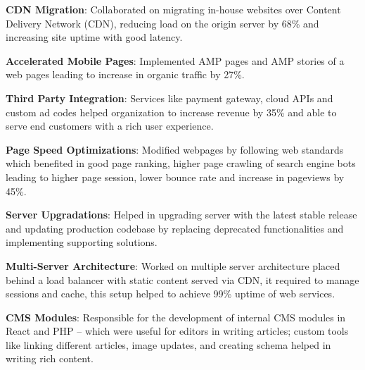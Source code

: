 \documentclass[letterpaper,11pt]{article}
\newcommand{\resumeItem}[2]{
  \item\small{
    \textbf{#1}{: #2 \vspace{-2pt}}
  }
}
\begin{document}
        \resumeItem
        {CDN Migration}
        {Collaborated on migrating in-house websites over Content Delivery Network (CDN), reducing load on the origin server by 68\% and increasing site uptime with good latency.}
        
        \resumeItem
        {Accelerated Mobile Pages}
        {Implemented AMP pages and AMP stories of a web pages leading to increase in organic traffic by 27\%.}
        
        \resumeItem
        {Third Party Integration}
        {Services like payment gateway, cloud APIs and custom ad codes helped organization to increase revenue by 35\% and able to serve end customers with a rich user experience.}
        
        \resumeItem
        {Page Speed Optimizations}
        {Modified webpages by following web standards which benefited in good page ranking, higher page crawling of search engine bots leading to higher page session, lower bounce rate and increase in pageviews by 45\%.}

        \resumeItem
        {Server Upgradations}
        {Helped in upgrading server with the latest stable release and updating production codebase by replacing deprecated functionalities and implementing supporting solutions.}
        
        \resumeItem
        {Multi-Server Architecture}
        {Worked on multiple server architecture placed behind a load balancer with static content served via CDN, it required to manage sessions and cache, this setup helped to achieve 99\% uptime of web services.}
        
        \resumeItem
        {CMS Modules}
        {Responsible for the development of internal CMS modules in React and PHP -- which were useful for editors in writing articles; custom tools like linking different articles, image updates, and creating schema helped in writing rich content.}
                
        
        
        
        
        
        
\end{document}
